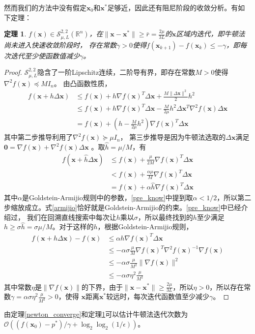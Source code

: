 \documentclass{article}
\newtheorem{thm}{定理}
\begin{document}
然而我们的方法中没有假定$\bm x_0$和$\bm x^*$足够近，因此还有阻尼阶段的收敛分析。有如下定理：
\begin{thm}
    \label{newton_converge_2}
    $f(\bm x)\in\mathcal{S}_{\mu,L}^{2,2}(\mathbb{R}^n)$，在$\|\bm x-\bm x^*\|\ge \bar r=\frac{2\mu}{3L}$的$\bm x$区域内迭代，即牛顿法尚未进入快速收敛阶段时，
    存在常数$\gamma>0$使得$f(\bm x_{k+1})-f(\bm x_k)\le -\gamma$，即每次迭代至少使函数值减少$\gamma$。
\end{thm}
\begin{proof}
$\mathcal S_{\mu,L}^{2,2}$隐含了一阶Lipschitz连续，二阶导有界，即存在常数$M>0$使得$\nabla^2f(\bm x)\preceq MI_n$。
由凸函数性质，
\begin{align*}
    f(\bm x+h\Delta\bm x)& \le f(\bm x)+h\nabla f(\bm x)^T\Delta\bm x+\frac{M\|\Delta\bm x\|^2}{2}h^2 \\
    & \le f(\bm x)+h\nabla f(\bm x)^T\Delta\bm x-\frac{M}{2\mu}h^2\Delta\bm x^T\nabla^2f(\bm x)\Delta\bm x\\
    & = f(\bm x)+(h-\frac{M}{2\mu}h^2)\nabla f(\bm x)^T\Delta\bm x
\end{align*}
其中第二步推导利用了$\nabla^2f(\bm x)\succeq \mu I_n$，
第三步推导是因为牛顿法选取的$\Delta \bm x$满足$\bm 0=\nabla f(\bm x)+\nabla^2f(\bm x)\Delta \bm x$
。取$\widehat h=\mu/M$，有
\begin{equation}
\label{armijio}
\begin{aligned}
    f(\bm x+\widehat h\Delta \bm x)&\le f(\bm x)+\frac{\mu}{2M}\nabla f(\bm x)^T\Delta\bm x\\
    &< f(\bm x)+\frac{\alpha \mu}{M}\nabla f(\bm x)^T\Delta\bm x\\
    &=f(\bm x)+\alpha \widehat h\nabla f(\bm x)^T\Delta\bm x
\end{aligned}
\end{equation}
其中$\alpha$是Goldstein-Armijio规则中的参数，\ref{pre_know}中提到取$\alpha<1/2$，所以第二步缩放成立。式\eqref{armijio}恰好就是Goldstein-Armijio的约束。\ref{pre_know}中已经介绍过，
我们在回溯直线搜索中每次让$h$乘以$\sigma$，所以最终找到的$h$至少满足$h\ge \sigma\widehat h=\sigma\mu/M$。对于这样的$h$，根据Goldstein-Armijio规则，
\begin{align*}
    f(\bm x+h\Delta\bm x)-f(\bm x)&\le \alpha h\nabla f(\bm x)^T\Delta\bm x \\
    & \le -\alpha\sigma\frac{\mu}{M}\nabla f(\bm x)^T\nabla^2f(\bm x)^{-1}\nabla f(\bm x) \\
    & \le -\alpha\sigma\frac{\mu}{M^2}\|\nabla f(\bm x)\|^2 \\
    & \le -\alpha\sigma\eta^2\frac{\mu}{M^2}
\end{align*}
其中常数$\eta$是$\|\nabla f(\bm x)\|$的下界，由于$\|\bm x-\bm x^*\|\ge \frac{2\mu}{3L}$，所以$\eta > 0$，所以存在常数$\gamma=\alpha\sigma\eta^2\frac{\mu}{M^2}>0$，使得
$\bm x$距离$\bm x^*$较远时，每次迭代函数值至少减少$\gamma $。

\end{proof}
由定理\ref{newton_converge}和定理\ref{newton_converge_2}可以估计牛顿法迭代次数为$\mathcal O((f(\bm x_0)-p^*)/\gamma+\log_2\log_2(1/\epsilon))$。
\label{time_complexity_newton}
\end{document}

